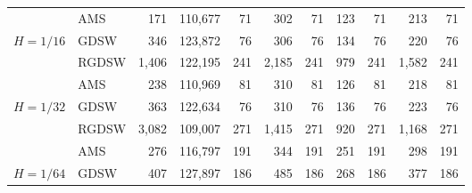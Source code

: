 \begin{table}[H]
\begin{tabular}{llrrrrrrrrr}
\cline{2-11}
\bfseries  & AMS & 171 & {\cellcolor[HTML]{FFFFE5}} \color[HTML]{000000} 110,677 & 71 & {\cellcolor[HTML]{BCE395}} \color[HTML]{000000} 302 & 71 & {\cellcolor[HTML]{379E54}} \color[HTML]{F1F1F1} 123 & 71 & {\cellcolor[HTML]{004529}} \color[HTML]{F1F1F1} 213 & 71 \\
\cline{1-11} \cline{2-11}
\multirow[c]{3}{*}{\bfseries $H=1/16$} & GDSW & 346 & {\cellcolor[HTML]{379E54}} \color[HTML]{F1F1F1} 123,872 & 76 & {\cellcolor[HTML]{FFFFE5}} \color[HTML]{000000} 306 & 76 & {\cellcolor[HTML]{BCE395}} \color[HTML]{000000} 134 & 76 & {\cellcolor[HTML]{004529}} \color[HTML]{F1F1F1} 220 & 76 \\
\cline{2-11}
\bfseries  & RGDSW & 1,406 & {\cellcolor[HTML]{FFFFE5}} \color[HTML]{000000} 122,195 & 241 & {\cellcolor[HTML]{BCE395}} \color[HTML]{000000} 2,185 & 241 & {\cellcolor[HTML]{379E54}} \color[HTML]{F1F1F1} 979 & 241 & {\cellcolor[HTML]{004529}} \color[HTML]{F1F1F1} 1,582 & 241 \\
\cline{2-11}
\bfseries  & AMS & 238 & {\cellcolor[HTML]{FFFFE5}} \color[HTML]{000000} 110,969 & 81 & {\cellcolor[HTML]{379E54}} \color[HTML]{F1F1F1} 310 & 81 & {\cellcolor[HTML]{BCE395}} \color[HTML]{000000} 126 & 81 & {\cellcolor[HTML]{004529}} \color[HTML]{F1F1F1} 218 & 81 \\
\cline{1-11} \cline{2-11}
\multirow[c]{3}{*}{\bfseries $H=1/32$} & GDSW & 363 & {\cellcolor[HTML]{379E54}} \color[HTML]{F1F1F1} 122,634 & 76 & {\cellcolor[HTML]{FFFFE5}} \color[HTML]{000000} 310 & 76 & {\cellcolor[HTML]{BCE395}} \color[HTML]{000000} 136 & 76 & {\cellcolor[HTML]{004529}} \color[HTML]{F1F1F1} 223 & 76 \\
\cline{2-11}
\bfseries  & RGDSW & 3,082 & {\cellcolor[HTML]{379E54}} \color[HTML]{F1F1F1} 109,007 & 271 & {\cellcolor[HTML]{FFFFE5}} \color[HTML]{000000} 1,415 & 271 & {\cellcolor[HTML]{BCE395}} \color[HTML]{000000} 920 & 271 & {\cellcolor[HTML]{004529}} \color[HTML]{F1F1F1} 1,168 & 271 \\
\cline{2-11}
\bfseries  & AMS & 276 & {\cellcolor[HTML]{FFFFE5}} \color[HTML]{000000} 116,797 & 191 & {\cellcolor[HTML]{BCE395}} \color[HTML]{000000} 344 & 191 & {\cellcolor[HTML]{379E54}} \color[HTML]{F1F1F1} 251 & 191 & {\cellcolor[HTML]{004529}} \color[HTML]{F1F1F1} 298 & 191 \\
\cline{1-11} \cline{2-11}
\multirow[c]{3}{*}{\bfseries $H=1/64$} & GDSW & 407 & {\cellcolor[HTML]{FFFFE5}} \color[HTML]{000000} 127,897 & 186 & {\cellcolor[HTML]{379E54}} \color[HTML]{F1F1F1} 485 & 186 & {\cellcolor[HTML]{BCE395}} \color[HTML]{000000} 268 & 186 & {\cellcolor[HTML]{004529}} \color[HTML]{F1F1F1} 377 & 186 \\

\end{tabular}
\end{table}
